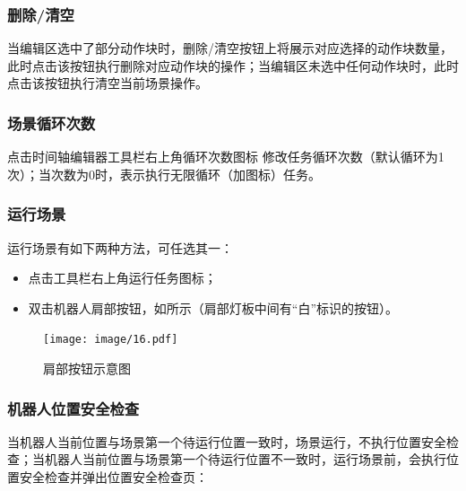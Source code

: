 \subsubsection{删除/清空}
当编辑区选中了部分动作块时，删除/清空按钮上将展示对应选择的动作块数量，此时点击该按钮执行删除对应动作块的操作；当编辑区未选中任何动作块时，此时点击该按钮执行清空当前场景操作。

\subsubsection{场景循环次数}
点击时间轴编辑器工具栏右上角循环次数图标 修改任务循环次数（默认循环为1次）；当次数为0时，表示执行无限循环（加图标）任务。
\subsubsection{运行场景}
\label{sec:运行场景}
运行场景有如下两种方法，可任选其一：
\begin{itemize}
	\item 点击工具栏右上角运行任务图标；
	\item 双击机器人肩部按钮，如所示（肩部灯板中间有“白”标识的按钮）。
\end{itemize}

\begin{figure}[ht]
	\centering
	\texttt{[image: image/16.pdf]}
	\caption{肩部按钮示意图}
	\label{fig:肩部按钮示意图}
\end{figure}


\subsubsection{机器人位置安全检查}
当机器人当前位置与场景第一个待运行位置一致时，场景运行，不执行位置安全检查；当机器人当前位置与场景第一个待运行位置不一致时，运行场景前，会执行位置安全检查并弹出位置安全检查页：

